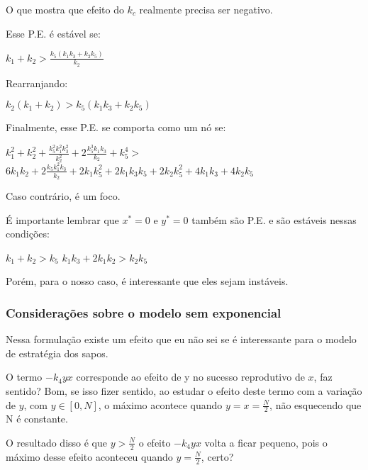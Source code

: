 O que mostra que efeito do $k_c$ realmente precisa ser negativo.

Esse P.E. é estável se:


$k_1 + k_2 > \frac{k_5(k_1 k_3 + k_2 k_5)}{k_2}$
\vspace{3 mm}

Rearranjando:

\vspace{3 mm}
$k_2(k_1 + k_2) > k_5(k_1 k_3 + k_2 k_5)$

Finalmente, esse P.E. se comporta como um nó se:

$k^2_1 + k_2^2 + \frac{k_5^2 k_1^2 k_3^2}{k_2^2} +2 \frac{k_5^3 k_1 k_3}{k_2} +k_5^4 > $
$ 6 k_1 k_2 + 2 \frac{k_5 k_1^2 k_3}{k_2} + 2 k_1 k_5^2 + 2k_1 k_3 k_5 + 2 k_2 k_5^2 + 4 k_1 k_3 + 4 k_2 k_5$ 

Caso contrário, é um foco.

É importante lembrar que $x^*=0$ e $y^*=0$ também são P.E. e são estáveis nessas condições:

\vspace{3 mm}
$k_1 + k_2 > k_5$
$k_1 k_3 + 2k_1 k_2 > k_2 k_5$

Porém, para o nosso caso, é interessante que eles sejam instáveis.

\subsubsection{Considerações sobre o modelo sem exponencial}
Nessa formulação existe um efeito que eu não sei se é interessante para o modelo de estratégia dos sapos.

O termo $-k_4 yx$ corresponde ao efeito de y no sucesso reprodutivo de $x$, faz sentido? Bom, se isso fizer sentido, ao estudar o efeito deste termo com a variação de $y$, com $y \in [0,N]$, o máximo acontece quando $y=x=\frac{N}{2}$, não esquecendo que N é constante.

O resultado disso é que $y > \frac{N}{2}$ o efeito $-k_4 yx$ volta a ficar pequeno, pois o máximo desse efeito aconteceu quando $y=\frac{N}{2}$, certo?